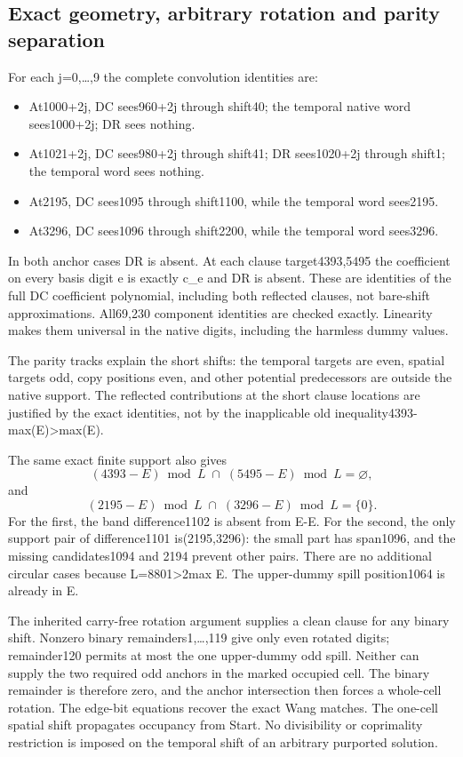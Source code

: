 \documentclass[
  10pt,
]{article}
\providecommand{\tightlist}{%
  \setlength{\itemsep}{0pt}\setlength{\parskip}{0pt}}
\begin{document}
\subsection{Exact geometry, arbitrary rotation and parity
separation}\label{exact-geometry-arbitrary-rotation-and-parity-separation}

For each j=0,\ldots,9 the complete convolution identities are:

\begin{itemize}
\tightlist
\item
  At1000+2j, DC sees960+2j through shift40; the temporal native word
  sees1000+2j; DR sees nothing.
\item
  At1021+2j, DC sees980+2j through shift41; DR sees1020+2j through
  shift1; the temporal word sees nothing.
\item
  At2195, DC sees1095 through shift1100, while the temporal word
  sees2195.
\item
  At3296, DC sees1096 through shift2200, while the temporal word
  sees3296.
\end{itemize}

In both anchor cases DR is absent. At each clause target4393,5495 the
coefficient on every basis digit e is exactly c\_e and DR is absent.
These are identities of the full DC coefficient polynomial, including
both reflected clauses, not bare-shift approximations. All69,230
component identities are checked exactly. Linearity makes them universal
in the native digits, including the harmless dummy values.

The parity tracks explain the short shifts: the temporal targets are
even, spatial targets odd, copy positions even, and other potential
predecessors are outside the native support. The reflected contributions
at the short clause locations are justified by the exact identities, not
by the inapplicable old inequality4393-max(E)\textgreater max(E).

The same exact finite support also gives \[
 (4393-E)\bmod L\;\cap\;(5495-E)\bmod L=\varnothing,
\] and \[
 (2195-E)\bmod L\;\cap\;(3296-E)\bmod L=\{0\}.
\] For the first, the band difference1102 is absent from E-E. For the
second, the only support pair of difference1101 is(2195,3296): the small
part has span1096, and the missing candidates1094 and 2194 prevent other
pairs. There are no additional circular cases because
L=8801\textgreater2max E. The upper-dummy spill position1064 is already
in E.

The inherited carry-free rotation argument supplies a clean clause for
any binary shift. Nonzero binary remainders1,\ldots,119 give only even
rotated digits; remainder120 permits at most the one upper-dummy odd
spill. Neither can supply the two required odd anchors in the marked
occupied cell. The binary remainder is therefore zero, and the anchor
intersection then forces a whole-cell rotation. The edge-bit equations
recover the exact Wang matches. The one-cell spatial shift propagates
occupancy from Start. No divisibility or coprimality restriction is
imposed on the temporal shift of an arbitrary purported solution.
\end{document}

